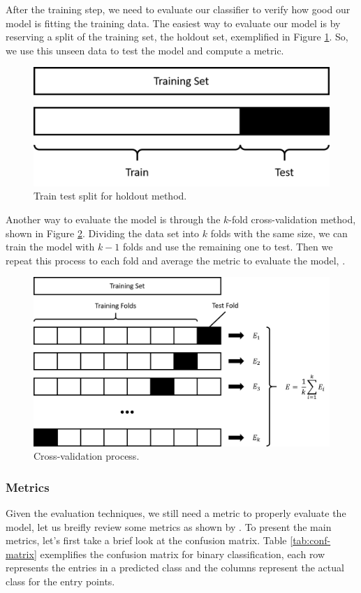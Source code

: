 	After the training step, we need to evaluate our classifier to verify how good our model is fitting the training data. The easiest way to evaluate our model is by reserving a split of the training set, the holdout set, exemplified in Figure \ref{fig:holdout-evaluate}. So, we use this unseen data to test the model and compute a metric.
	
	\begin{figure}[h!]
		\centering
		\includegraphics[width=0.5\linewidth]{01.Chapters/02.Background/holdout-evaluate}
		\caption{Train test split for holdout method.}
		\label{fig:holdout-evaluate}
	\end{figure}

	Another way to evaluate the model is through the $k$-fold cross-validation method, shown in Figure \ref{fig:cross-validate}. Dividing the data set into $k$ folds with the same size, we can train the model with $k-1$ folds and use the remaining one to test. Then we repeat this process to each fold and average the metric to evaluate the model, \cite{schaffer1993selecting}.

	\begin{figure}[h!]
		\centering
		\includegraphics[width=0.6\linewidth]{01.Chapters/02.Background/cross-validate}
		\caption{Cross-validation process.}
		\label{fig:cross-validate}
	\end{figure}
	
	\subsubsection{Metrics}
	\label{sub-sub:metrics}

	Given the evaluation techniques, we still need a metric to properly evaluate the model, let us breifly review some metrics as shown by . To present the main metrics, let's first take a brief look at the confusion matrix. Table \ref{tab:conf-matrix} exemplifies the confusion matrix for binary classification, each row represents the entries in a predicted class and the columns represent the actual class for the entry points.
	
